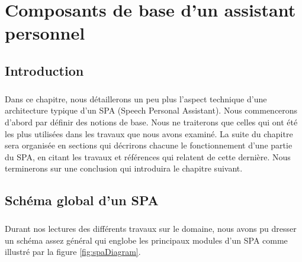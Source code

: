 \chapter{Composants de base d'un assistant personnel}

\section{Introduction}
\paragraph{}
Dans ce chapitre, nous détaillerons un peu plus l'aspect technique d'une architecture typique d'un SPA (Speech Personal Assistant). Nous commencerons d'abord par définir des notions de base. Nous ne  traiterons que celles qui ont été les plus utilisées dans les travaux que nous avons examiné. La suite du chapitre sera organisée en sections qui décrirons chacune le fonctionnement d'une partie du SPA, en citant les travaux et références qui relatent de cette dernière. Nous terminerons sur une conclusion qui introduira le chapitre suivant.

\section{Schéma global d'un SPA}
\label{spaSchemSection}
\paragraph{}
Durant nos lectures des différents travaux sur le domaine, nous avons pu dresser un schéma assez général qui englobe les principaux modules d'un SPA comme illustré par la figure \ref{fig:spaDiagram}.

